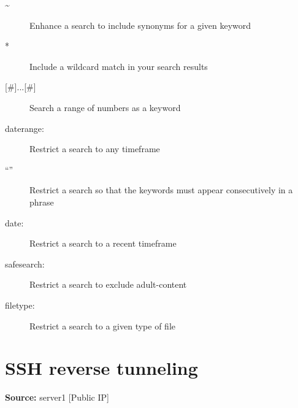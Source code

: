 \documentclass[letterpaper,10pt,english]{sphinxmanual}
\begin{document}
\begin{description}
\item[{\textasciitilde{}}] \leavevmode
Enhance a search to include synonyms for a given keyword

\item[{*}] \leavevmode
Include a wildcard match in your search results

\item[{{[}\#{]}...{[}\#{]}}] \leavevmode
Search a range of numbers as a keyword

\item[{daterange:}] \leavevmode
Restrict a search to any timeframe

\end{description}
\begin{description}
\item[{``''}] \leavevmode
Restrict a search so that the keywords must appear consecutively in a phrase

\item[{date:}] \leavevmode
Restrict a search to a recent timeframe

\item[{safesearch:}] \leavevmode
Restrict a search to exclude adult-content

\item[{filetype:}] \leavevmode
Restrict a search to a given type of file

\end{description}


\section{SSH reverse tunneling}
\label{_source/things/reverse_ssh::doc}\label{_source/things/reverse_ssh:ssh-reverse-tunneling}
\textbf{Source:} server1 {[}Public IP{]}
\end{document}
